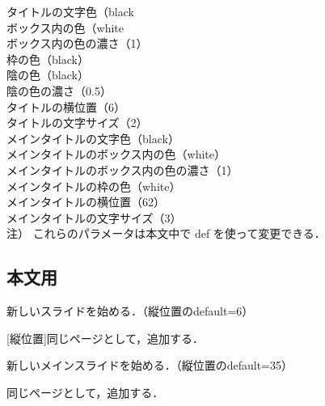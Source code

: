 \documentclass[a4j]{jarticle}
\begin{document}
\noindent
\hspace*{2zw}タイトルの文字色（black\\
\hspace*{2zw}ボックス内の色（white\\
\hspace*{2zw}ボックス内の色の濃さ（1）\\
\hspace*{2zw}枠の色（black）\\
\hspace*{2zw}陰の色（black）\\
\hspace*{2zw}陰の色の濃さ（0.5）\\
\hspace*{2zw}タイトルの横位置（6）\\
\hspace*{2zw}タイトルの文字サイズ（2）\\
\hspace*{2zw}メインタイトルの文字色（black）\\
\hspace*{2zw}メインタイトルのボックス内の色（white）\\
\hspace*{2zw}メインタイトルのボックス内の色の濃さ（1）\\
\hspace*{2zw}メインタイトルの枠の色（white）\\
\hspace*{2zw}メインタイトルの横位置（62）\\
\hspace*{2zw}メインタイトルの文字サイズ（3）\\
\hspace{6zw}注） これらのパラメータは本文中で \bs def を使って変更できる．


\subsection{本文用}

新しいスライドを始める．（縦位置のdefault=6）

[縦位置]同じページとして，追加する．

新しいメインスライドを始める．（縦位置のdefault=35）

同じページとして，追加する．
\end{document}
